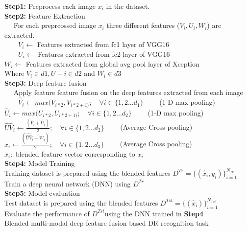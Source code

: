 \documentclass[electronics,article,accept ,moreauthors,pdftex]{mdpi}
\begin{document}
\begin{algorithm*}
    \SetAlgoLined
    \textbf{Step1:} Preprocess each image $x_i$ in the dataset. \\ 
    \textbf{Step2:} Feature Extraction \\
    $\quad$ For each preprcossed image $x_i$ three different features ($V_i, U_i, W_i$) are extracted. \\
    $ \qquad V_i \leftarrow $ Features extracted from fc1 layer of VGG16\\
    $ \qquad U_i \leftarrow $ Features extracted from fc2 layer of VGG16\\
    \qquad $W_i \leftarrow $ Features extracted from global avg pool layer of Xception\\
    \quad Where $V_i \in d1, U-i \in d2$ and $W_i \in d3$ \\ 
    \textbf{Step3:} Deep feature fusion\\
    $\quad$ Apply feature feature fusion on the deep features extracted from each image\\
    $\qquad \hat V_i \leftarrow  max(V_{i*2},V_{i*2 + 1)}; \quad \forall i \in \{1,2...d_1\} \qquad $  (1-D max pooling)\\
    \qquad $\hat U_i \leftarrow  max(U_{i*2},U_{i*2 + 1)}; \quad \forall i \in \{1,2...d_2\} \qquad $  (1-D max pooling)\\
    \qquad $\hat{UV}_i \leftarrow \frac{ (\hat V_{i}+ \hat U_{i})}{2}; \quad \forall i \in \{1,2...d_2\} \qquad $  (Average Cross pooling)\\
    \qquad $\hat{x}_i \leftarrow \frac{ (\hat {\hat{UV}}_{i}+  W_{i})}{2}; \quad \forall i \in \{1,2...d_3\} \qquad $  (Average Cross pooling)\\
    \qquad $\hat x_i:$ blended feature vector corresponding to $x_i$\\ 
    \textbf{Step4:} Model Training\\
    \quad Training dataset  is prepared using the blended features $D^{Tr} = \{(\hat x_i,y_i)\}_{i=1}^{N_{Tr}}$ \\
    \quad Train a deep neural network (DNN) using $D^{Tr}$\\ 
    \textbf{Step5:} Model evaluation\\
    \quad Test dataset is prepared using the blended features $D^{Tst} = \{(\hat x_i)\}_{i=1}^{N_{Tst}}$ \\
    \quad Evaluate the performance of $D^{Tst}$using the DNN trained in \textbf{Step4}\\
    \caption{Blended multi-modal deep feature fusion based DR recognition task}
    \label{algo}
\end{algorithm*}
\end{document}
